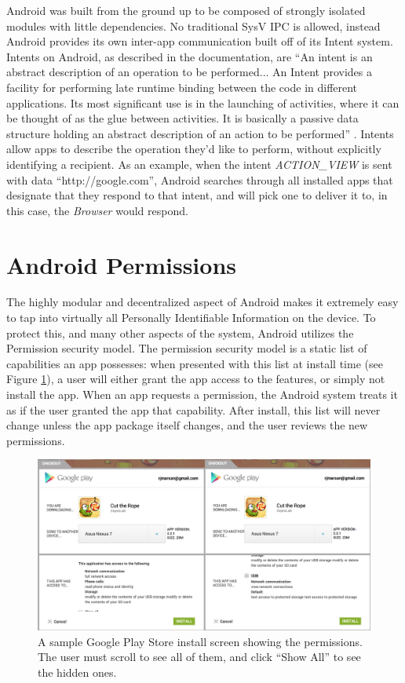Android was built from the ground up to be composed of strongly isolated modules with little dependencies. No traditional SysV IPC is allowed, instead Android provides its own inter-app communication built off of its Intent system. Intents on Android, as described in the documentation, are ``An intent is an abstract description of an operation to be performed... An Intent provides a facility for performing late runtime binding between the code in different applications. Its most significant use is in the launching of activities, where it can be thought of as the glue between activities. It is basically a passive data structure holding an abstract description of an action to be performed'' \citep{androidintents}. Intents allow apps to describe the operation they'd like to perform, without explicitly identifying a recipient. As an example, when the intent \textit{ACTION\_VIEW} is sent with data ``http://google.com'', Android searches through all installed apps that designate that they respond to that intent, and will pick one to deliver it to, in this case, the \textit{Browser} would respond.

\section{Android Permissions}
The highly modular and decentralized aspect of Android makes it extremely easy to tap into virtually all Personally Identifiable Information on the device. To protect this, and many other aspects of the system, Android utilizes the Permission security model. The permission security model is a static list of capabilities an app possesses: when presented with this list at install time (see Figure \ref{fig:gpstorepermissions}), a user will either grant the app access to the features, or simply not install the app. When an app requests a permission, the Android system treats it as if the user granted the app that capability. After install, this list will never change unless the app package itself changes, and the user reviews the new permissions.

\begin{figure}[h]
\begin{center}
\includegraphics[width=1.0\columnwidth]{figs/GPStoreInstallScreen}
\caption{A sample Google Play Store install screen showing the permissions. The user must scroll to see all of them, and click ``Show All'' to see the hidden ones.}
\label{fig:gpstorepermissions}
\end{center}
\end{figure}

